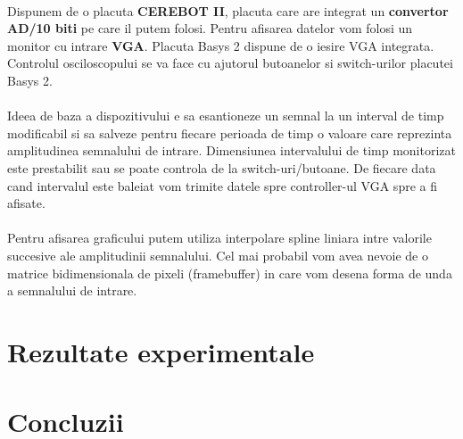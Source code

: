 \documentclass[10pt,a4paper]{article}
\begin{document}
\paragraph{}
Dispunem de o placuta \textbf{CEREBOT II}, placuta care are integrat un  \textbf{convertor AD/10 biti} pe care il putem folosi. Pentru afisarea datelor vom folosi un monitor cu intrare \textbf{VGA}. Placuta Basys 2 dispune de o iesire VGA integrata. Controlul osciloscopului se va face cu ajutorul butoanelor si switch-urilor placutei Basys 2.
\paragraph{}
Ideea de baza a dispozitivului e sa esantioneze un semnal la un interval de timp modificabil si sa salveze pentru fiecare perioada de timp o valoare care reprezinta amplitudinea semnalului de intrare. Dimensiunea intervalului de timp monitorizat este prestabilit sau se poate controla de la switch-uri/butoane. De fiecare data cand intervalul este baleiat vom trimite datele spre controller-ul VGA spre a fi afisate. 
\paragraph{}
Pentru afisarea graficului putem utiliza interpolare spline liniara intre valorile succesive ale amplitudinii semnalului. Cel mai probabil vom avea nevoie de o matrice bidimensionala de pixeli (framebuffer) in care vom desena forma de unda a semnalului de intrare.

\section{Rezultate experimentale}

\section{Concluzii}

\clearpage


\end{document}
